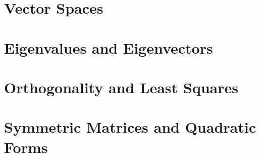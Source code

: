 \documentclass[10pt]{book}
\theoremstyle{definition}
\begin{document}
\chapter{Vector Spaces}



\chapter{Eigenvalues and Eigenvectors}



\chapter{Orthogonality and Least Squares}



\chapter{Symmetric Matrices and Quadratic Forms}


\end{document}
